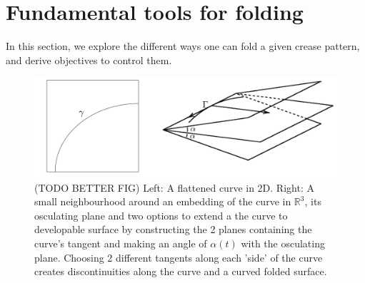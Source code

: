 \section{Fundamental tools for folding} \label{sec:folding}
In this section, we explore the different ways one can fold a given crease pattern, and derive objectives to control them.

\begin{figure} [h]
	\centering
	\includegraphics[width=0.7\linewidth]{figures/curved_fold_through_curve.pdf}
	\caption{(TODO BETTER FIG) Left: A flattened curve in 2D. Right: A small neighbourhood around an embedding of the curve in $\mathbb{R}^3$, its osculating plane and two options to extend a the curve to developable surface by constructing the 2 planes containing the curve's tangent and making an angle of $\alpha(t)$  with the osculating plane. Choosing 2 different tangents along each 'side' of the curve creates discontinuities along the curve and a curved folded surface.}
	\label{fig:curved_fold_through_curve}
\end{figure}

